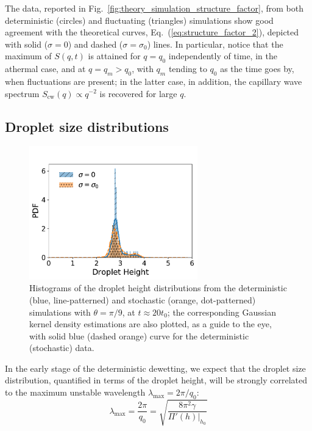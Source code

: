 The data, reported in Fig.~\ref{fig:theory_simulation_structure_factor}, from both deterministic (circles) and fluctuating (triangles) simulations show good agreement with the theoretical curves, Eq.~(\ref{eq:structure_factor_2}), depicted with solid ($\sigma=0$) and dashed ($\sigma=\sigma_0$) lines.
In particular, notice that the maximum of $S(q,t)$ is attained for $q=q_0$ independently of time, in the athermal case, and at $q = q_m > q_0$, with $q_m$ tending to $q_0$ as the time goes by, when fluctuations are present; in the latter case, in addition, the capillary wave spectrum $S_{\text{cw}}(q) \propto q^{-2}$ is recovered for large $q$.

\subsection{Droplet size distributions}\label{subsec:morphandrup}
\begin{figure}
    \centering
    \includegraphics[width=0.65\textwidth]{graphics/Droplet_height_['00', '1e-7']_distri_new_35_nodist.pdf}
    \caption{Histograms of the droplet height distributions from the deterministic (blue, line-patterned) and stochastic (orange, dot-patterned) simulations with $\theta = \pi/9$, at $t \approx 20 t_0$; the corresponding Gaussian kernel density estimations are also plotted, as a guide to the eye, with solid blue (dashed orange) curve for the deterministic (stochastic) data.}
    \label{fig:droplet_distribution}
\end{figure}
In the early stage of the deterministic dewetting, we expect that the droplet size distribution, quantified in terms of the droplet height, will be strongly correlated to the maximum unstable wavelength $\lambda_{\text{max}} =2\pi/q_0$:
\begin{equation}\label{eq:lambda_max}
    \lambda_{\text{max}} = \frac{2\pi}{q_0} = \sqrt{\frac{8\pi^2\gamma}{\Pi'(h)|_{h_0}}} 
\end{equation}
